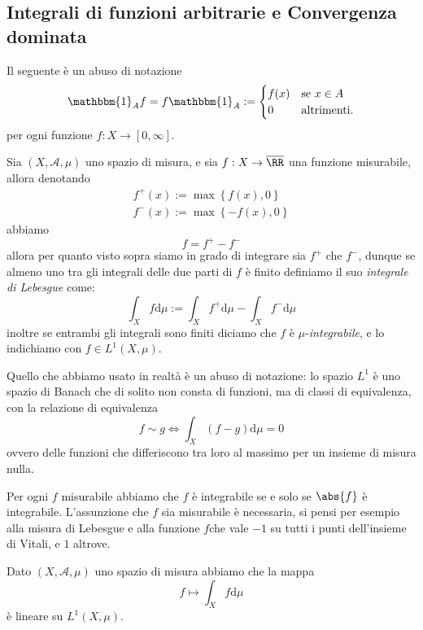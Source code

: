 \documentclass[11pt]{scrartcl}
\newcommand{\dif}{\text{d}}
\begin{document}
	\subsection{Integrali di funzioni arbitrarie e Convergenza dominata}
	\begin{definition}
		Il seguente è un abuso di notazione
		$$\mathbbm{1}_Af=f\mathbbm{1}_A:=\begin{cases}
			f(x) & \text{se $x\in A$} \\
			0 & \text{altrimenti.}
		\end{cases}$$
		per ogni funzione $f:X\to [0,\infty]$.
	\end{definition}
	\begin{definition}
		Sia $(X,\mathcal{A},\mu)$ uno spazio di misura, e sia $f:X\to\overline{\RR}$ una funzione misurabile, allora denotando
		\begin{gather*}
			f^+(x):=\max\left\{f(x),0\right\} \\
			f^-(x):=\max\left\{-f(x),0\right\}
		\end{gather*}
		abbiamo 
		$$f=f^+-f^-$$
		allora per quanto visto sopra siamo in grado di integrare sia $f^+$ che $f^-$, dunque se almeno uno tra gli integrali delle due parti di $f$ è finito definiamo il suo \textit{integrale di Lebesgue} come:
		$$\int_X f\dif \mu:=\int_X f^+\dif \mu - \int_X f^- \dif \mu$$
		inoltre se entrambi gli integrali sono finiti diciamo che $f$ è $\mu$-\textit{integrabile}, e lo indichiamo con $f\in L^1(X,\mu)$.
	\end{definition}
	Quello che abbiamo usato in realtà è un abuso di notazione: lo spazio $L^1$ è uno spazio di Banach che di solito non consta di funzioni, ma di classi di equivalenza, con la relazione di equivalenza
	$$f\sim g \iff \int_X\left(f-g\right)\dif \mu=0$$
	ovvero delle funzioni che differiscono tra loro al massimo per un insieme di misura nulla.
	\begin{remark}
		Per ogni $f$ misurabile abbiamo che $f$ è integrabile se e solo se $\abs{f}$ è integrabile. L'assunzione che $f$ sia misurabile è necessaria, si pensi per esempio alla misura di Lebesgue e alla funzione $f$che vale $-1$ su tutti i punti dell'insieme di Vitali, e $1$ altrove.
	\end{remark}
	\begin{theorem}
		Dato $(X,\mathcal{A},\mu)$ uno spazio di misura abbiamo che la mappa 
		$$f\mapsto \int_X f \dif \mu$$
		è lineare su $L^1(X,\mu)$.
	\end{theorem}
\end{document}

